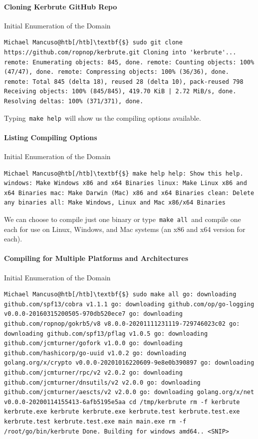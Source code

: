 \paragraph{Cloning Kerbrute GitHub Repo}

Initial Enumeration of the Domain

\begin{verbatim}
Michael Mancuso@htb[/htb]\textbf{$} sudo git clone https://github.com/ropnop/kerbrute.git Cloning into 'kerbrute'... remote: Enumerating objects: 845, done. remote: Counting objects: 100% (47/47), done. remote: Compressing objects: 100% (36/36), done. remote: Total 845 (delta 18), reused 28 (delta 10), pack-reused 798 Receiving objects: 100% (845/845), 419.70 KiB | 2.72 MiB/s, done. Resolving deltas: 100% (371/371), done. 
\end{verbatim}

Typing \verb|make help| will show us the compiling options available.

\paragraph{Listing Compiling Options}

Initial Enumeration of the Domain

\begin{verbatim}
Michael Mancuso@htb[/htb]\textbf{$} make help help: Show this help. windows: Make Windows x86 and x64 Binaries linux: Make Linux x86 and x64 Binaries mac: Make Darwin (Mac) x86 and x64 Binaries clean: Delete any binaries all: Make Windows, Linux and Mac x86/x64 Binaries 
\end{verbatim}

We can choose to compile just one binary or type \verb|make all| and compile one each for use on Linux, Windows, and Mac systems (an x86 and x64 version for each).

\paragraph{Compiling for Multiple Platforms and Architectures}

Initial Enumeration of the Domain

\begin{verbatim}
Michael Mancuso@htb[/htb]\textbf{$} sudo make all go: downloading github.com/spf13/cobra v1.1.1 go: downloading github.com/op/go-logging v0.0.0-20160315200505-970db520ece7 go: downloading github.com/ropnop/gokrb5/v8 v8.0.0-20201111231119-729746023c02 go: downloading github.com/spf13/pflag v1.0.5 go: downloading github.com/jcmturner/gofork v1.0.0 go: downloading github.com/hashicorp/go-uuid v1.0.2 go: downloading golang.org/x/crypto v0.0.0-20201016220609-9e8e0b390897 go: downloading github.com/jcmturner/rpc/v2 v2.0.2 go: downloading github.com/jcmturner/dnsutils/v2 v2.0.0 go: downloading github.com/jcmturner/aescts/v2 v2.0.0 go: downloading golang.org/x/net v0.0.0-20200114155413-6afb5195e5aa cd /tmp/kerbrute rm -f kerbrute kerbrute.exe kerbrute kerbrute.exe kerbrute.test kerbrute.test.exe kerbrute.test kerbrute.test.exe main main.exe rm -f /root/go/bin/kerbrute Done. Building for windows amd64.. <SNIP> 
\end{verbatim}

